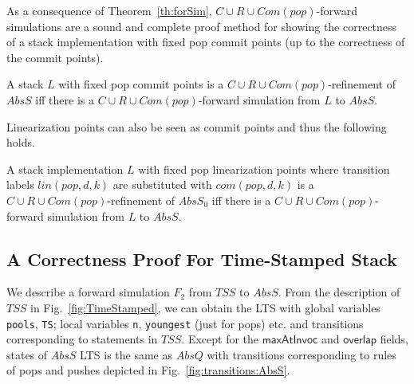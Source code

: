 
As a consequence of Theorem~\ref{th:forSim}, $C\cup R\cup Com(pop)$-forward simulations are a sound and complete proof method for showing the correctness of a stack implementation with fixed pop commit points (up to the correctness of the commit points). 


\vspace{-1.5mm}
\begin{corollary}
A stack $L$ with fixed pop commit points is a $C\cup R\cup Com(pop)$-refinement of $AbsS$ if{f} there is a $C\cup R\cup Com(pop)$-forward simulation from $L$ to $AbsS$.
\vspace{-1.5mm}
\end{corollary}

Linearization points can also be seen as commit points and thus the following holds.

\vspace{-1.5mm}
\begin{corollary}
A stack implementation $L$ with fixed pop linearization points where transition labels $lin(pop,d,k)$ are substituted with $com(pop,d,k)$ is a $C\cup R\cup Com(pop)$-refinement of $AbsS_0$ if{f} there is a $C\cup R\cup Com(pop)$-forward simulation from $L$ to $AbsS$.
\vspace{-1.5mm}
\end{corollary}


\vspace{-6mm}
\subsection{A Correctness Proof For Time-Stamped Stack}\label{sec:corr_tss}
\vspace{-1mm}
We describe a forward simulation $F_2$ from $\mathit{TSS}$ to $AbsS$. From the description of $\mathit{TSS}$ in Fig.~\ref{fig:TimeStamped}, we can obtain the LTS with global variables {\tt pools}, {\tt TS}; local variables {\tt n}, {\tt youngest} (just for pops) etc. and transitions corresponding to statements in $\mathit{TSS}$. Except for the $\mathsf{maxAtInvoc}$ and $\mathsf{overlap}$ fields, states of $AbsS$ LTS is the same as $AbsQ$ with transitions corresponding to rules of pops and pushes depicted in Fig.~\ref{fig:transitions:AbsS}. 

